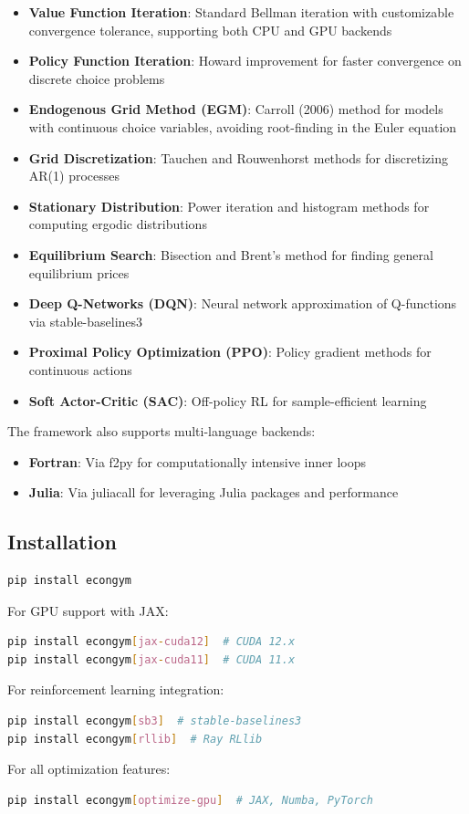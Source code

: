 \documentclass[12pt]{article}
\begin{document}
\begin{itemize}
    \item \textbf{Value Function Iteration}: Standard Bellman iteration with customizable convergence tolerance, supporting both CPU and GPU backends
    \item \textbf{Policy Function Iteration}: Howard improvement for faster convergence on discrete choice problems
    \item \textbf{Endogenous Grid Method (EGM)}: Carroll (2006) method for models with continuous choice variables, avoiding root-finding in the Euler equation
    \item \textbf{Grid Discretization}: Tauchen and Rouwenhorst methods for discretizing AR(1) processes
    \item \textbf{Stationary Distribution}: Power iteration and histogram methods for computing ergodic distributions
    \item \textbf{Equilibrium Search}: Bisection and Brent's method for finding general equilibrium prices
    \item \textbf{Deep Q-Networks (DQN)}: Neural network approximation of Q-functions via stable-baselines3
    \item \textbf{Proximal Policy Optimization (PPO)}: Policy gradient methods for continuous actions
    \item \textbf{Soft Actor-Critic (SAC)}: Off-policy RL for sample-efficient learning
\end{itemize}

The framework also supports multi-language backends:
\begin{itemize}
    \item \textbf{Fortran}: Via f2py for computationally intensive inner loops
    \item \textbf{Julia}: Via juliacall for leveraging Julia packages and performance
\end{itemize}

\subsection{Installation}

\begin{lstlisting}[language=bash]
pip install econgym
\end{lstlisting}

For GPU support with JAX:
\begin{lstlisting}[language=bash]
pip install econgym[jax-cuda12]  # CUDA 12.x
pip install econgym[jax-cuda11]  # CUDA 11.x
\end{lstlisting}

For reinforcement learning integration:
\begin{lstlisting}[language=bash]
pip install econgym[sb3]  # stable-baselines3
pip install econgym[rllib]  # Ray RLlib
\end{lstlisting}

For all optimization features:
\begin{lstlisting}[language=bash]
pip install econgym[optimize-gpu]  # JAX, Numba, PyTorch
\end{lstlisting}
\end{document}

